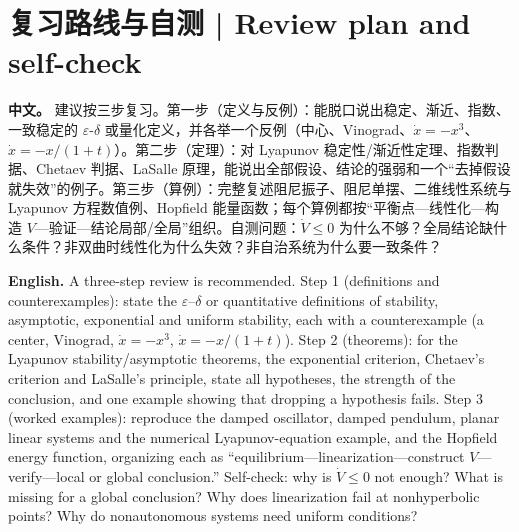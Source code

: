 \documentclass[UTF8,11pt,a4paper]{ctexart}
\newcommand{\APS}[2]{\par\noindent\textbf{中文。} #1\par\noindent\textbf{English.} #2\par}
\begin{document}
\section*{复习路线与自测 | Review plan and self-check}
\APS{建议按三步复习。第一步（定义与反例）：能脱口说出稳定、渐近、指数、一致稳定的 $\varepsilon$-$\delta$ 或量化定义，并各举一个反例（中心、Vinograd、$\dot x=-x^3$、$\dot x=-x/(1+t)$）。第二步（定理）：对 Lyapunov 稳定性/渐近性定理、指数判据、Chetaev 判据、LaSalle 原理，能说出全部假设、结论的强弱和一个“去掉假设就失效”的例子。第三步（算例）：完整复述阻尼振子、阻尼单摆、二维线性系统与 Lyapunov 方程数值例、Hopfield 能量函数；每个算例都按“平衡点—线性化—构造 $V$—验证—结论局部/全局”组织。自测问题：$\dot V\le0$ 为什么不够？全局结论缺什么条件？非双曲时线性化为什么失效？非自治系统为什么要一致条件？}{A three-step review is recommended. Step 1 (definitions and counterexamples): state the $\varepsilon$--$\delta$ or quantitative definitions of stability, asymptotic, exponential and uniform stability, each with a counterexample (a center, Vinograd, $\dot x=-x^3$, $\dot x=-x/(1+t)$). Step 2 (theorems): for the Lyapunov stability/asymptotic theorems, the exponential criterion, Chetaev's criterion and LaSalle's principle, state all hypotheses, the strength of the conclusion, and one example showing that dropping a hypothesis fails. Step 3 (worked examples): reproduce the damped oscillator, damped pendulum, planar linear systems and the numerical Lyapunov-equation example, and the Hopfield energy function, organizing each as “equilibrium—linearization—construct $V$—verify—local or global conclusion.” Self-check: why is $\dot V\le0$ not enough? What is missing for a global conclusion? Why does linearization fail at nonhyperbolic points? Why do nonautonomous systems need uniform conditions?}
\end{document}
